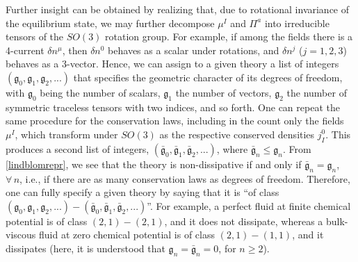 \documentclass[aps,prl,singlecolumn,nofootinbib]{revtex4-2}
\theoremstyle{definition}
\theoremstyle{theorem}
\begin{document}
Further insight can be obtained by realizing that, due to rotational invariance of the equilibrium state, we may further decompose $\mu^I$ and $\Pi^a$ into irreducible tensors of the $SO(3)$ rotation group. For example, if among the fields there is a 4-current $\delta n^\mu$, then $\delta n^0$ behaves as a scalar under rotations, and $\delta n^j$ ($j=1,2,3$) behaves as a 3-vector. Hence, we can assign to a given theory a list of integers $(\mathfrak{g}_0,\mathfrak{g}_1,\mathfrak{g}_2,...)$ that specifies the geometric character of its degrees of freedom,  with  $\mathfrak{g}_0$ being the number of scalars, $\mathfrak{g}_1$ the number of vectors, $\mathfrak{g}_2$ the number of symmetric traceless tensors with two indices, and so forth. One can repeat the same procedure for the conservation laws, including in the count only the fields $\mu^I$, which transform under $SO(3)$ as the respective conserved densities $j_I^0$. This produces a second list of integers,  $(\bar{\mathfrak{g}}_0,\bar{\mathfrak{g}}_1,\bar{\mathfrak{g}}_2,...)$, where $\bar{\mathfrak{g}}_n \leq \mathfrak{g}_n$. From \eqref{lindblomrepr}, we see that the theory is non-dissipative if and only if $\bar{\mathfrak{g}}_n =\mathfrak{g}_n$, $\forall \, n$, i.e., if there are as many conservation laws as degrees of freedom. Therefore, one can fully specify a given theory by saying that it is ``of class $(\mathfrak{g}_0,\mathfrak{g}_1,\mathfrak{g}_2,...)-(\bar{\mathfrak{g}}_0,\bar{\mathfrak{g}}_1,\bar{\mathfrak{g}}_2,...)$''. 
For example, a perfect fluid at finite chemical potential is of class $(2,1)-(2,1)$, and it does not dissipate, whereas a bulk-viscous fluid at zero chemical potential is of class $(2,1)-(1,1)$, and it dissipates (here, it is understood that $\mathfrak{g}_n=\bar{\mathfrak{g}}_n=0$, for $n \geq 2$). 



\end{document}

